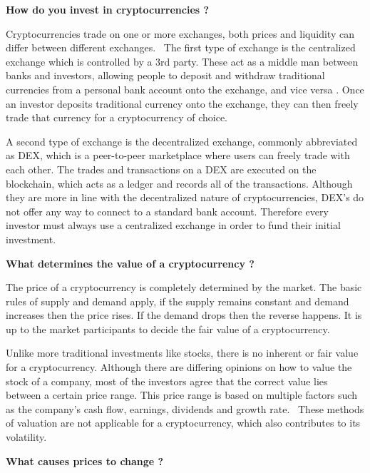 \textbf{How do you invest in cryptocurrencies ?} \bigbreak

Cryptocurrencies trade on one or more exchanges, both prices and liquidity can differ between different exchanges.~\autocite{Lewis2018a} The first type of exchange is the centralized exchange which is controlled by a 3rd party. These act as a middle man between banks and investors, allowing people to deposit and withdraw traditional currencies from a personal bank account onto the exchange, and vice versa . Once an investor deposits traditional currency onto the exchange, they can then freely trade that currency for a cryptocurrency of choice.~\autocite{Reiff2021}\bigbreak

A second type of exchange is the decentralized exchange, commonly abbreviated as DEX, which is a peer-to-peer marketplace where users can freely trade with each other. The trades and transactions on a DEX are executed on the blockchain, which acts as a ledger and records all of the transactions. Although they are more in line with the decentralized nature of cryptocurrencies, DEX’s do not offer any way to connect to a standard bank account. Therefore every investor must always use a centralized exchange in order to fund their initial investment.
~\autocite{Aspris2021}\bigbreak

\textbf{What determines the value of a cryptocurrency ?} \bigbreak

The price of a cryptocurrency is completely determined by the market. The basic rules of supply and demand apply, if  the supply remains constant and demand increases then the price rises. If the demand drops then the reverse happens. It is up to the market participants to decide the fair value of a cryptocurrency.~\autocite{Lewis2018a} \bigbreak

Unlike more traditional investments like stocks, there is no inherent or fair value for a cryptocurrency. Although there are differing opinions on how to value the stock of a company, most of the investors agree that the correct value lies between a certain price range. This price range is based on multiple factors such as the company’s cash flow, earnings, dividends and growth rate.~\autocite{Schmidt2023} These methods of valuation are not applicable for a cryptocurrency, which also contributes to its volatility. \bigbreak

\textbf{What causes prices to change ?} \bigbreak


